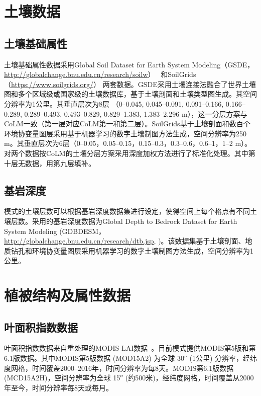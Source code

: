 \section{土壤数据}\label{土壤数据}
\subsection{土壤基础属性}\label{土壤基础属性}
土壤基础属性数据采用Global Soil Dataset for Earth System Modeling（GSDE，\url{http://globalchange.bnu.edu.cn/research/soilw}）~\citep{shangguan2014global}
和SoilGrids（\url{https://www.soilgrids.org/}）\citep{poggio2021soilgrids} 两套数据。GSDE采用土壤连接法融合了世界土壤图和多个区域级或国家级的土壤数据库，基于土壤剖面和土壤类型图生成。其空间分辨率为1公里。其垂直层次为8层 （0--0.045, 0.045--0.091, 0.091--0.166, 0.166--0.289, 0.289--0.493, 0.493--0.829, 0.829--1.383, 1.383--2.296 m），这一分层方案与CoLM一致（第一层对应CoLM第一和第二层）。SoilGrids基于土壤剖面和数百个环境协变量图层采用基于机器学习的数字土壤制图方法生成，空间分辨率为250 m。其垂直层次为6层（0--0.05，0.05--0.15，0.15--0.3，0.3--0.6，0.6--1，1--2 m）。对两个数据按CoLM的土壤分层方案采用深度加权方法进行了标准化处理。其中第十层无数据，用第九层填补。

\subsection{基岩深度}\label{基岩深度}

模式的土壤层数可以根据基岩深度数据集进行设定，使得空间上每个格点有不同土壤层数。采用的基岩深度数据为Global Depth to Bedrock Dataset for Earth System Modeling (GDBDESM，\url{http://globalchange.bnu.edu.cn/research/dtb.jsp}, \citet{shangguan2017mapping})。该数据集基于土壤剖面、地质钻孔和环境协变量图层采用机器学习的数字土壤制图方法生成，空间分辨率为1公里。


\section{植被结构及属性数据}\label{植被结构及属性数据}
\subsection{叶面积指数数据}\label{叶面积指数数据}
叶面积指数数据来自重处理的MODIS LAI数据~\citep{yuan20143d}。目前模式提供MODIS第5版和第6.1版数据。其中MODIS第5版数据 (MOD15A2) 为全球 \ang{;;30} (1公里) 分辨率，经纬度网格，时间覆盖2000--2016年，时间分辨率为每8天。MODIS第6.1版数据 (MCD15A2H)，空间分辨率为全球 \ang{;;15} (约500米)，经纬度网格，时间覆盖从2000年至今，时间分辨率每8天或每月。


